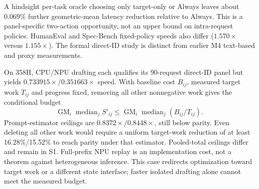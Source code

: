 A hindsight per-task oracle choosing only target-only or Always leaves about 0.069\% further geometric-mean latency reduction relative to Always. This is a panel-specific two-action opportunity, not an upper bound on intra-request policies. HumanEval and Spec-Bench fixed-policy speeds also differ ($1.570\times$ versus $1.155\times$). The formal direct-ID study is distinct from earlier M4 text-based and proxy measurements.

On 358H, CPU/NPU drafting each qualifies its 90-request direct-ID panel but yields $0.733915\times/0.351663\times$ speed. With baseline cost $B_{ij}$, measured target work $T_{ij}$ and progress fixed, removing all other nonnegative work gives the conditional budget
\begin{equation}
\operatorname{GM}_{i}\operatorname{median}_{j} S'_{ij}
\leq \operatorname{GM}_{i}\operatorname{median}_{j}(B_{ij}/T_{ij}).
\label{eq:floor}
\end{equation}
Prompt-estimator ceilings are $0.8372\times/0.8448\times$, still below parity. Even deleting all other work would require a uniform target-work reduction of at least 16.28\%/15.52\% to reach parity under that estimator. Pooled-total ceilings differ and remain in S1. Full-prefix NPU replay is an implementation cost, not a theorem against heterogeneous inference. This case redirects optimization toward target work or a different state interface; faster isolated drafting alone cannot meet the measured budget.
